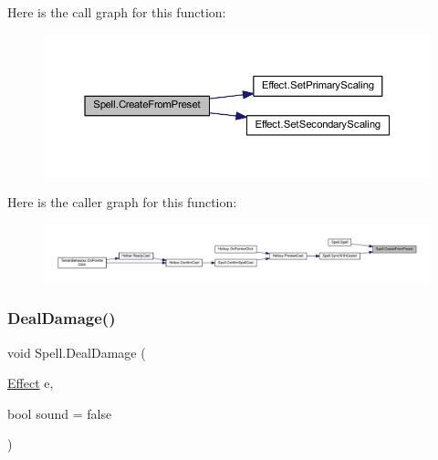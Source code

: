 Here is the call graph for this function\+:
\nopagebreak
\begin{figure}[H]
\begin{center}
\leavevmode
\includegraphics[width=350pt]{class_spell_aee08370358e033af2bf7e0c4c2f2b2bd_cgraph}
\end{center}
\end{figure}
Here is the caller graph for this function\+:
\nopagebreak
\begin{figure}[H]
\begin{center}
\leavevmode
\includegraphics[width=350pt]{class_spell_aee08370358e033af2bf7e0c4c2f2b2bd_icgraph}
\end{center}
\end{figure}
\mbox{\label{class_spell_ad2e4f64f1f7ced4b69c55619d5fdb0b0}} 
\subsubsection{\texorpdfstring{DealDamage()}{DealDamage()}}
{\footnotesize\ttfamily void Spell.\+Deal\+Damage (\begin{DoxyParamCaption}\item[{\mbox{\hyperlink{class_effect}{Effect}}}]{e,  }\item[{bool}]{sound = {\ttfamily false} }\end{DoxyParamCaption})}


